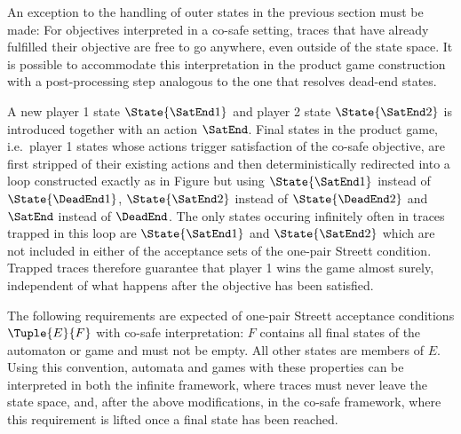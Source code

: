 \stopsubsection


\startsubsection[title={Co-Safe Interpretation},reference=sec:abstraction-product-cosafe]

    An exception to the handling of outer states in the previous section must be made:
    For objectives interpreted in a co-safe setting, traces that have already fulfilled their objective are free to go anywhere, even outside of the state space.
    It is possible to accommodate this interpretation in the product game construction with a post-processing step analogous to the one that resolves dead-end states.

    A new player 1 state $\State{\SatEnd1}$ and player 2 state $\State{\SatEnd2}$ is introduced together with an action $\SatEnd$.
    Final states in the product game, i.e.\ player 1 states whose actions trigger satisfaction of the co-safe objective, are first stripped of their existing actions and then deterministically redirected into a loop constructed exactly as in Figure  but using $\State{\SatEnd1}$ instead of $\State{\DeadEnd1}$, $\State{\SatEnd2}$ instead of $\State{\DeadEnd2}$ and $\SatEnd$ instead of $\DeadEnd$.
    The only states occuring infinitely often in traces trapped in this loop are $\State{\SatEnd1}$ and $\State{\SatEnd2}$ which are not included in either of the acceptance sets of the one-pair Streett condition.
    Trapped traces therefore guarantee that player 1 wins the game almost surely, independent of what happens after the objective has been satisfied.

    The following requirements are expected of one-pair Streett acceptance conditions $\Tuple{E}{F}$ with co-safe interpretation:
    $F$ contains all final states of the automaton or game and must not be empty.
    All other states are members of $E$.
    Using this convention, automata and games with these properties can be interpreted in both the infinite framework, where traces must never leave the state space, and, after the above modifications, in the co-safe framework, where this requirement is lifted once a final state has been reached.

\stopsubsection

